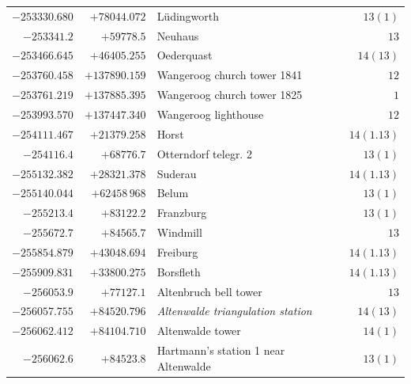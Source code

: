 \begin{center}
\begin{tabular}{r|r|p{170pt}|r}
\(-253330.680\)&\(+78044.072\)&Lüdingworth&\(13(1)\)\\
\(-253341.2\)&\(+59778.5\)&Neuhaus&\(13\)\\
\(-253466.645\)&\(+46405.255\)&Oederquast&\(14(13)\)\\
\(-253760.458\)&\(+137890.159\)&Wangeroog church tower 1841&\(12\)\\
\(-253761.219\)&\(+137885.395\)&Wangeroog church tower 1825&\(1\)\\
\(-253993.570\)&\(+137447.340\)&Wangeroog lighthouse&\(12\)\\
\(-254111.467\)&\(+21379.258\)&Horst&\(14(1.13)\)\\
\(-254116.4\)&\(+68776.7\)&Otterndorf telegr. 2&\(13(1)\)\\
\(-255132.382\)&\(+28321.378\)&Suderau&\(14(1.13)\)\\
\(-255140.044\)&\(+62458\,968\)&Belum&\(13(1)\)\\
\(-255213.4\)&\(+83122.2\)&Franzburg&\(13(1)\)\\
\(-255672.7\)&\(+84565.7\)&Windmill&\(13\)\\
\(-255854.879\)&\(+43048.694\)&Freiburg&\(14(1.13)\)\\
\(-255909.831\)&\(+33800.275\)&Borsfleth&\(14(1.13)\)\\
\(-256053.9\)&\(+77127.1\)&Altenbruch bell tower&\(13\)\\
\(-256057.755\)&\(+84520.796\)&\textit{Altenwalde triangulation station}&\(14(13)\)\\
\(-256062.412\)&\(+84104.710\)&Altenwalde tower&\(14(1)\)\\
\(-256062.6\)&\(+84523.8\)&Hartmann’s station 1 near Altenwalde&\(13(1)\)\\
\hline\end{tabular}\endgroup\end{center}
